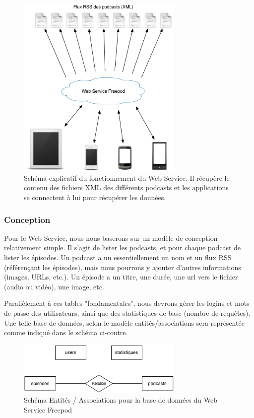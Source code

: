 \documentclass[11pt, french]{report}
\begin{document}
\begin{figure}[!h]
	\begin{center}
	\includegraphics[width=8cm]{schema_webserv.png}
	\caption{\small{Schéma explicatif du fonctionnement du Web Service. Il récupère le contenu des fichiers XML des différents podcasts et les applications se connectent à lui pour récupérer les données.}} \label{webserv}
	\end{center}
\end{figure}

\subsubsection{Conception}

Pour le Web Service, nous nous baserons sur un modèle de conception relativement simple. Il s'agit de lister les podcasts, et pour chaque podcast de lister les épisodes. Un podcast a un essentiellement un nom et un flux RSS (référençant les épisodes), mais nous pourrons y ajouter d'autres informations (images, URLs, etc.). Un épisode a un titre, une durée, une url vers le fichier (audio ou vidéo), une image, etc.

Parallèlement à ces tables "fondamentales", nous devrons gérer les logins et mots de passe des utilisateurs, ainsi que des statistiques de base (nombre de requêtes). Une telle base de données, selon le modèle entités/associations sera représentée comme indiqué dans le schéma ci-contre.

\begin{figure}[!h]
	\begin{center}
	\includegraphics[width=8cm]{schema_entite_assoc.png}
	\caption{\small{Schéma Entités / Associations pour la base de données du Web Service Freepod}} \label{entiteAssoc}
	\end{center}
\end{figure}
\end{document}
